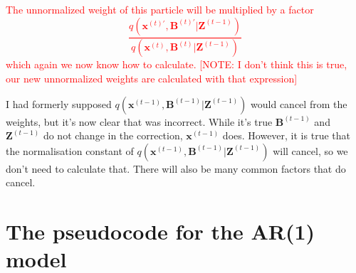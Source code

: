 \documentclass[11pt,a4paper]{article}
\renewcommand{\vec}[1]{\mathbf{#1}}
\begin{document}
\textcolor{red}{The unnormalized weight of this particle will be multiplied by a factor 
\[
\frac{q(\vec{x}^{(t)\prime},\vec{B}^{(t)\prime} | \vec{Z}^{(t-1)})}{q(\vec{x}^{(t)},\vec{B}^{(t)} | \vec{Z}^{(t-1)})}
\]
which again we now know how to calculate.
[NOTE: I don't think this is true, our new unnormalized weights are calculated with that expression]}

I had formerly supposed $q(\vec{x}^{(t-1)},\vec{B}^{(t-1)} | \vec{Z}^{(t-1)})$ would cancel from the weights, but it's now clear that was incorrect. While it's true $\vec{B}^{(t-1)}$ and $\vec{Z}^{(t-1)}$ do not change in the correction, $\vec{x}^{(t-1)}$ does. However, it is true that the normalisation constant of $q(\vec{x}^{(t-1)},\vec{B}^{(t-1)} | \vec{Z}^{(t-1)})$ will cancel, so we don't need to calculate that. There will also be many common factors that do cancel.
	





\section{The pseudocode for the AR(1) model}
\end{document}
